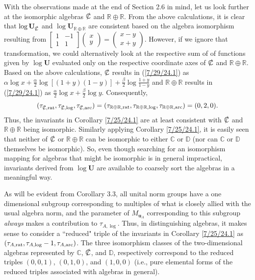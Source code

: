 \documentclass{amsart}
\numberwithin{equation}{section}
\theoremstyle{definition}
\numberwithin{theorem}{section}
\begin{document}
With the observations made at the end of Section 2.6 in mind, let us look further at the isomorphic algebras $\slashed{\mathbb{C}}$ and $\mathbb{R}\oplus\mathbb{R}$.  From the above calculations, it is clear that $\log\mathbf{U}_{\slashed{\mathbb{C}}}$ and $\log\mathbf{U}_{\mathbb{R}\oplus\mathbb{R}}$ are consistent based on the algebra isomorphism resulting from $\left[\begin{array}{ccc}
 1 & -1   \\ 
 1 & 1    
\end{array}\right]\left(\begin{array}{ccc}
x   \\ 
y   
\end{array}\right) = \left(\begin{array}{ccc}
x-y   \\ 
x+y   
\end{array}\right)$.  However, if we ignore that transformation, we could alternatively look at the respective sum of of functions given by $\log\mathbf{U}$ evaluated only on the respective coordinate axes of $\slashed{\mathbb{C}}$ and $\mathbb{R}\oplus\mathbb{R}$.  Based on the above calculations, $\slashed{\mathbb{C}}$ results in (\ref{7/29/24.1}) as $\alpha\log x+ \frac{\alpha}{2}\log[(1+
y)(1-y)] +  \frac{\beta}{2}\log \frac{1+y}{1-y}$ and $\mathbb{R}\oplus\mathbb{R}$ results in (\ref{7/29/24.1}) as $\frac{\alpha}{2}\log x +\frac{\beta}{2} \log y$. Consequently,  \[(\tau_{\slashed{\mathbb{C}},{\rm rat}},\tau_{\slashed{\mathbb{C}},{\rm log}},\tau_{\slashed{\mathbb{C}},{\rm arc}}) = (\tau_{\mathbb{R}\oplus\mathbb{R},{\rm rat}},\tau_{\mathbb{R}\oplus\mathbb{R},{\rm log}},\tau_{\mathbb{R}\oplus\mathbb{R},{\rm arc}}) = (0,2,0). \] Thus, the invariants in Corollary \ref{7/25/24.1} are at least consistent with $\slashed{\mathbb{C}}$ and $\mathbb{R}\oplus\mathbb{R}$ being isomorphic.  Similarly applying Corollary \ref{7/25/24.1}, it is easily seen that neither of $\slashed{\mathbb{C}}$ or $\mathbb{R}\oplus\mathbb{R}$ can be isomorphic to either $\mathbb{C}$ or $\mathbb{D}$ (nor can  $\mathbb{C}$ or $\mathbb{D}$ themselves be isomorphic).   So, even though searching for an isomorphism mapping for algebras that might be isomorphic is in general impractical, invariants derived from $\log\mathbf{U}$ are available to coarsely sort the algebras in a meaningful way.

As will be evident from Corollary 3.3, all unital norm groups have a one dimensional subgroup corresponding to multiples of what is closely allied with the usual algebra norm, and the parameter of $M_{\mathbf{u}_A}$ corresponding to this subgroup {\it always} makes a contribution to $\tau_{A,\log}$.  Thus, in distinguishing algebras, it makes sense to consider a ``reduced" triple of the invariants in Corollary \ref{7/25/24.1} as $(\tau_{A,{\rm rat}},\tau_{A,{\rm log}}-1,\tau_{A,{\rm arc}})$.  The three isomorphism classes of the two-dimensional algebras represented by $\mathbb{C}$, $\slashed{\mathbb{C}}$, and $\mathbb{D}$, respectively correspond to the reduced triples $(0,0,1)$, $(0,1,0)$, and $(1,0,0)$ (i.e., pure elemental forms of the reduced triples associated with algebras in general).
   
\end{document}
